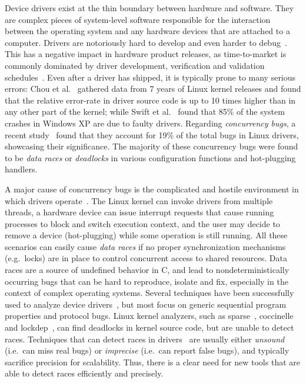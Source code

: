 Device drivers exist at the thin boundary between hardware and software. They are complex pieces of system-level software responsible for the interaction between the operating system and any hardware devices that are attached to a computer. Drivers are notoriously hard to develop and even harder to debug~\cite{corbet2005linux}. This has a negative impact in hardware product releases, as time-to-market is commonly dominated by driver development, verification and validation schedules~\cite{yavatkar2012era}.
%
Even after a driver has shipped, it is typically prone to many serious errors: Chou et al.~\cite{chou2001empirical} gathered data from 7 years of Linux kernel releases and found that the relative error-rate in driver source code is up to 10 times higher than in any other part of the kernel; while Swift et al.~\cite{Swift2003windowsxp} found that 85\% of the system crashes in Windows XP are due to faulty drivers. Regarding \emph{concurrency bugs}, a recent study~\cite{ryzhyk2009dingo} found that they account for 19\% of the total bugs in Linux drivers, showcasing their significance. The majority of these concurrency bugs were found to be \emph{data races} or \emph{deadlocks} in various configuration functions and hot-plugging handlers.

A major cause of concurrency bugs is the complicated and hostile environment in which drivers operate~\cite{corbet2005linux}. The Linux kernel can invoke drivers from multiple threads, a hardware device can issue interrupt requests that cause running processes to block and switch execution context, and the user may decide to remove a device (hot-plugging) while some operation is still running. All these scenarios can easily cause \emph{data races} if no proper synchronization mechanisms (e.g.\ locks) are in place to control concurrent access to shared resources.
%
Data races are a source of undefined behavior in C, and lead to nondeterministically occurring bugs that can be hard to reproduce, isolate and fix, especially in the context of complex operating systems.
%
Several techniques have been successfully used to analyze device drivers~\cite{ball2006thorough, clarke2004predicate, engler2000checking, henzinger2002temporal, cook2006termination, kuznetsov2010testing, renzelmann2012symdrive, lal2012corral}, but most focus on generic sequential program properties and protocol bugs. Linux kernel analyzers, such as sparse~\cite{corbet2004sparse}, coccinelle~\cite{padioleau2008doc} and lockdep~\cite{corbet2006lock}, can find deadlocks in kernel source code, but are unable to detect races. Techniques that can detect races in drivers~\cite{qadeer2004kiss, pratikakis2006locksmith, voung2007relay, lal2012corral} are usually either \emph{unsound} (i.e.\ can miss real bugs) or \emph{imprecise} (i.e.\ can report false bugs), and typically sacrifice precision for scalability. Thus, there is a clear need for new tools that are able to detect races efficiently and precisely.

